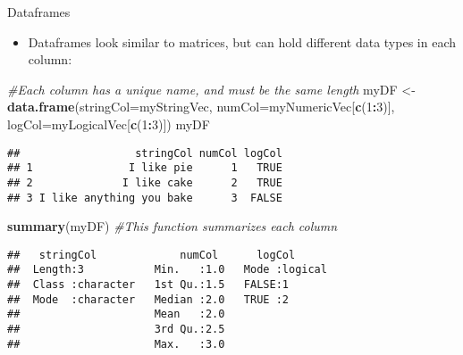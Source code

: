 \documentclass[
  ignorenonframetext,
  aspectratio=169]{beamer}
\newenvironment{Shaded}{\begin{snugshade}}{\end{snugshade}}
\newcommand{\AttributeTok}[1]{\textcolor[rgb]{0.13,0.29,0.53}{#1}}
\newcommand{\CommentTok}[1]{\textcolor[rgb]{0.56,0.35,0.01}{\textit{#1}}}
\newcommand{\DecValTok}[1]{\textcolor[rgb]{0.00,0.00,0.81}{#1}}
\newcommand{\FunctionTok}[1]{\textcolor[rgb]{0.13,0.29,0.53}{\textbf{#1}}}
\newcommand{\NormalTok}[1]{#1}
\newcommand{\OtherTok}[1]{\textcolor[rgb]{0.56,0.35,0.01}{#1}}
\newcommand{\SpecialCharTok}[1]{\textcolor[rgb]{0.81,0.36,0.00}{\textbf{#1}}}
\providecommand{\tightlist}{%
  \setlength{\itemsep}{0pt}\setlength{\parskip}{0pt}}
\begin{document}
\begin{frame}[fragile]{Dataframes}
\protect\hypertarget{dataframes}{}
\begin{itemize}[<+->]
\tightlist
\item
  Dataframes look similar to matrices, but can hold different data types
  in each column:
\end{itemize}

\footnotesize

\begin{Shaded}
\begin{Highlighting}[]
\CommentTok{\#Each column has a unique name, and must be the same length}
\NormalTok{myDF }\OtherTok{\textless{}{-}} \FunctionTok{data.frame}\NormalTok{(}\AttributeTok{stringCol=}\NormalTok{myStringVec, }\AttributeTok{numCol=}\NormalTok{myNumericVec[}\FunctionTok{c}\NormalTok{(}\DecValTok{1}\SpecialCharTok{:}\DecValTok{3}\NormalTok{)], }
                   \AttributeTok{logCol=}\NormalTok{myLogicalVec[}\FunctionTok{c}\NormalTok{(}\DecValTok{1}\SpecialCharTok{:}\DecValTok{3}\NormalTok{)])}
\NormalTok{myDF}
\end{Highlighting}
\end{Shaded}

\begin{verbatim}
##                  stringCol numCol logCol
## 1               I like pie      1   TRUE
## 2              I like cake      2   TRUE
## 3 I like anything you bake      3  FALSE
\end{verbatim}

\begin{Shaded}
\begin{Highlighting}[]
\FunctionTok{summary}\NormalTok{(myDF) }\CommentTok{\#This function summarizes each column}
\end{Highlighting}
\end{Shaded}

\begin{verbatim}
##   stringCol             numCol      logCol       
##  Length:3           Min.   :1.0   Mode :logical  
##  Class :character   1st Qu.:1.5   FALSE:1        
##  Mode  :character   Median :2.0   TRUE :2        
##                     Mean   :2.0                  
##                     3rd Qu.:2.5                  
##                     Max.   :3.0
\end{verbatim}

\normalsize
\end{frame}
\end{document}
